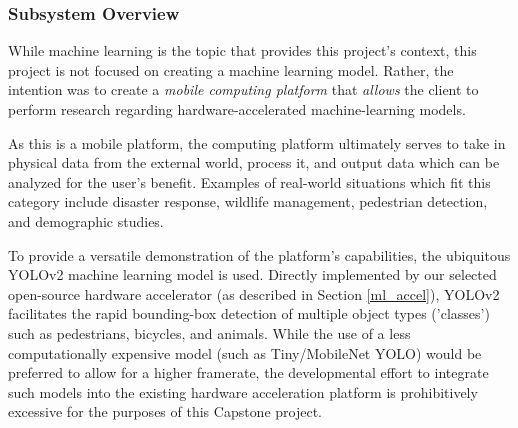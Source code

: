 
\subsubsection{Subsystem Overview} \label{ml_desc}
While machine learning is the topic that provides this project's context, this project is not focused on creating a machine learning model. Rather, the intention was to create a \textit{mobile computing platform} that \textit{allows} the client to perform research regarding hardware-accelerated machine-learning models.

As this is a mobile platform, the computing platform ultimately serves to take in physical data from the external world, process it, and output data which can be analyzed for the user's benefit. Examples of real-world situations which fit this category include disaster response, wildlife management, pedestrian detection, and demographic studies.

To provide a versatile demonstration of the platform's capabilities, the ubiquitous YOLOv2 machine learning model is used. Directly implemented by our selected open-source hardware accelerator (as described in Section \ref{ml_accel}), YOLOv2 facilitates the rapid bounding-box detection of multiple object types ('classes') such as pedestrians, bicycles, and animals. While the use of a less computationally expensive model (such as Tiny/MobileNet YOLO) would be preferred to allow for a higher framerate, the developmental effort to integrate such models into the existing hardware acceleration platform is prohibitively excessive for the purposes of this Capstone project.

